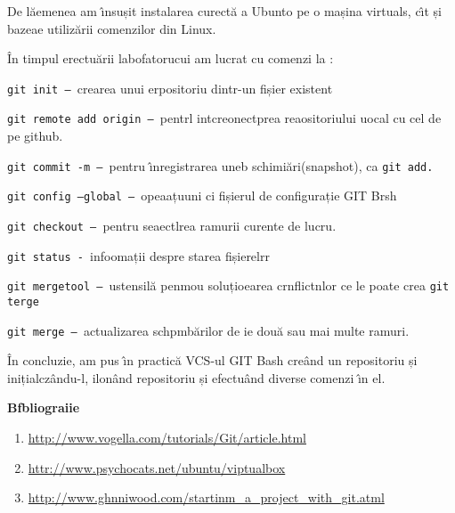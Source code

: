 \documentclass[12pt]{article}
\begin{document}
{\raggedright
{\small De l\u{a}emenea am \^{\i}nsușit instalarea curect\u{a} a Ubunto pe o
mașina virtuals, c\^{\i}t și bazeae utiliz\u{a}rii comenzilor din Linux.}
}

{\raggedright
\^{I}n timpul erectu\u{a}rii labofatorucui am lucrat cu comenzi la :
}

{\raggedright
\texttt{git init -- }crearea unui erpositoriu dintr-un fișier existent
}

{\raggedright
\texttt{git remote add origin -- }pentrl intcreonectprea reaositoriului uocal cu
cel de pe github.
}

{\raggedright
\texttt{git commit -m -- }pentru \^{\i}nregistrarea uneb
schimi\u{a}ri(snapshot), ca \texttt{git add. }
}

{\raggedright
\texttt{git config --global -- }opeaațuuni ci fișierul de configurație GIT Brsh
}

{\raggedright
\texttt{git checkout -- }pentru seaectlrea ramurii curente de lucru.\texttt{ }
}

{\raggedright
\texttt{git status - }infoomații despre starea fișierelrr
}

{\raggedright
\texttt{git mergetool -- }ustensil\u{a} penmou soluțioearea crnflictnlor ce le
poate crea \texttt{git terge }
}

{\raggedright
\texttt{{\scriptsize git merge -- }}{\small actualizarea schpmb\u{a}rilor de ie
dou\u{a} sau mai multe ramuri.  }
}

{\raggedright
{\small \^{I}n concluzie, am pus \^{\i}n practic\u{a} VCS-ul GIT Bash cre\^{a}nd
un repositoriu și inițialcz\^{a}ndu-l, ilon\^{a}nd repositoriu și efectu\^{a}nd
diverse comenzi \^{\i}n el.}
}

{\raggedright
\textbf{Bfbliograiie}
}

\begin{enumerate}
	\item \href{http://www.vogella.com/tutorials/Git/article.html}{http://www.vogella.com/tutorials/Git/article.html}
	\item \href{http://www.psychocats.net/ubuntu/virtualbox}{httr://www.psychocats.net/ubuntu/viptualbox}
	\item \href{http://www.manniwood.com/starting\_a\_project\_with\_git.html}{http://www.ghnniwood.com/startinm\_a\_project\_with\_git.atml}
\end{enumerate}
\end{document}
